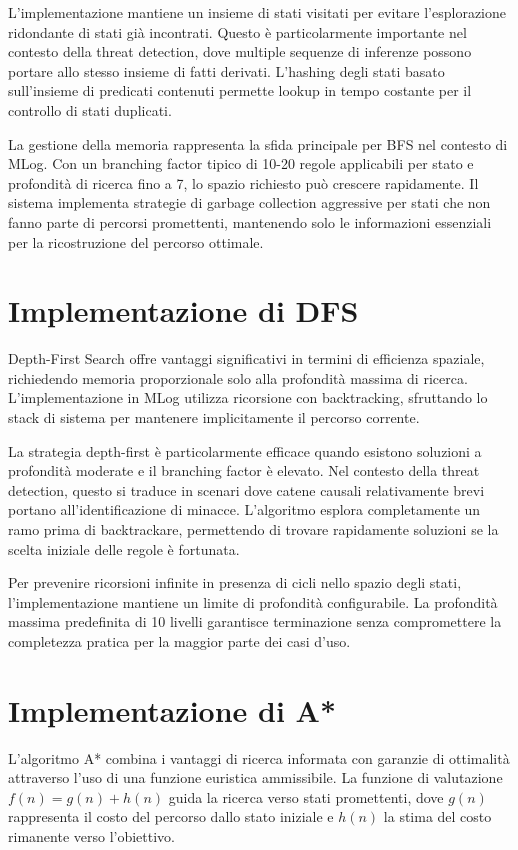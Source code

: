 \documentclass[12pt,a4paper]{report}
\theoremstyle{definition}
\begin{document}
L'implementazione mantiene un insieme di stati visitati per evitare l'esplorazione ridondante di stati già incontrati. Questo è particolarmente importante nel contesto della threat detection, dove multiple sequenze di inferenze possono portare allo stesso insieme di fatti derivati. L'hashing degli stati basato sull'insieme di predicati contenuti permette lookup in tempo costante per il controllo di stati duplicati.

La gestione della memoria rappresenta la sfida principale per BFS nel contesto di MLog. Con un branching factor tipico di 10-20 regole applicabili per stato e profondità di ricerca fino a 7, lo spazio richiesto può crescere rapidamente. Il sistema implementa strategie di garbage collection aggressive per stati che non fanno parte di percorsi promettenti, mantenendo solo le informazioni essenziali per la ricostruzione del percorso ottimale.

\section{Implementazione di DFS}

Depth-First Search offre vantaggi significativi in termini di efficienza spaziale, richiedendo memoria proporzionale solo alla profondità massima di ricerca. L'implementazione in MLog utilizza ricorsione con backtracking, sfruttando lo stack di sistema per mantenere implicitamente il percorso corrente.

La strategia depth-first è particolarmente efficace quando esistono soluzioni a profondità moderate e il branching factor è elevato. Nel contesto della threat detection, questo si traduce in scenari dove catene causali relativamente brevi portano all'identificazione di minacce. L'algoritmo esplora completamente un ramo prima di backtrackare, permettendo di trovare rapidamente soluzioni se la scelta iniziale delle regole è fortunata.

Per prevenire ricorsioni infinite in presenza di cicli nello spazio degli stati, l'implementazione mantiene un limite di profondità configurabile. La profondità massima predefinita di 10 livelli garantisce terminazione senza compromettere la completezza pratica per la maggior parte dei casi d'uso.

\section{Implementazione di A*}

L'algoritmo A* combina i vantaggi di ricerca informata con garanzie di ottimalità attraverso l'uso di una funzione euristica ammissibile. La funzione di valutazione $f(n) = g(n) + h(n)$ guida la ricerca verso stati promettenti, dove $g(n)$ rappresenta il costo del percorso dallo stato iniziale e $h(n)$ la stima del costo rimanente verso l'obiettivo.
\end{document}
